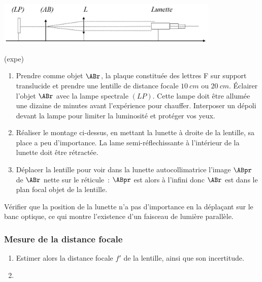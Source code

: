 \documentclass[../main/main.tex]{subfiles}
\begin{document}
\begin{center}
	\includegraphics[width=0.8\textwidth]{montage_foc_lunette}
\end{center}

\begin{tcb}(expe){}
	\begin{enumerate}
		\item Prendre comme objet $\ABr$, la plaque constituée des lettres F sur
		      support translucide et prendre une lentille de distance focale
		      $\SI{10}{cm}$ ou $\SI{20}{cm}$. Éclairer l'objet $\ABr$ avec la lampe
		      spectrale $(LP)$. Cette lampe doit être allumée une dizaine de minutes
		      avant l'expérience pour chauffer. Interposer un dépoli devant la lampe
		      pour limiter la luminosité et protéger vos yeux.
		\item Réaliser le montage ci-dessus, en mettant la lunette à droite de la
		      lentille, sa place a peu d'importance. La lame semi-réflechissante à
		      l'intérieur de la lunette doit être rétractée.
		\item Déplacer la lentille pour voir dans la lunette autocollimatrice
		      l'image $\ABpr$ de $\ABr$ nette sur le réticule~: $\ABpr$ est alors à
		      l'infini donc $\ABr$ est dans le plan focal objet de la lentille.
	\end{enumerate}
\end{tcb}

Vérifier que la position de la lunette n'a pas d'importance en la déplaçant sur
le banc optique, ce qui montre l'existence d'un faisceau de lumière parallèle.

\subsubsection{Mesure de la distance focale}

\begin{enumerate}[label=\sqenumi]
	\item Estimer alors la distance focale $f'$ de la lentille, ainsi que son
	      incertitude.
	\item {}
\end{enumerate}
\end{document}
